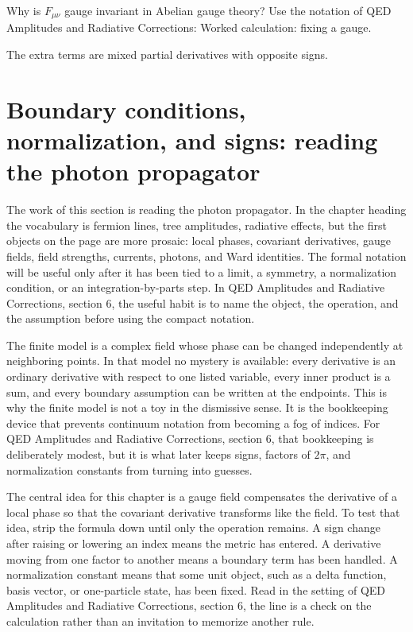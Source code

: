 \begin{exercise}
Why is \(F_{\mu\nu}\) gauge invariant in Abelian gauge theory?  Use the notation of QED Amplitudes and Radiative Corrections: Worked calculation: fixing a gauge.
\begin{answer}
The extra terms are mixed partial derivatives with opposite signs.
\end{answer}
\end{exercise}



\section{Boundary conditions, normalization, and signs: reading the photon propagator}

The work of this section is reading the photon propagator.  In the chapter heading the vocabulary is fermion lines, tree amplitudes, radiative effects, but the first objects on the page are more prosaic: local phases, covariant derivatives, gauge fields, field strengths, currents, photons, and Ward identities.  The formal notation will be useful only after it has been tied to a limit, a symmetry, a normalization condition, or an integration-by-parts step.  In QED Amplitudes and Radiative Corrections, section 6, the useful habit is to name the object, the operation, and the assumption before using the compact notation.

The finite model is a complex field whose phase can be changed independently at neighboring points.  In that model no mystery is available: every derivative is an ordinary derivative with respect to one listed variable, every inner product is a sum, and every boundary assumption can be written at the endpoints.  This is why the finite model is not a toy in the dismissive sense.  It is the bookkeeping device that prevents continuum notation from becoming a fog of indices.  For QED Amplitudes and Radiative Corrections, section 6, that bookkeeping is deliberately modest, but it is what later keeps signs, factors of \(2\pi\), and normalization constants from turning into guesses.

The central idea for this chapter is a gauge field compensates the derivative of a local phase so that the covariant derivative transforms like the field.  To test that idea, strip the formula down until only the operation remains.  A sign change after raising or lowering an index means the metric has entered.  A derivative moving from one factor to another means a boundary term has been handled.  A normalization constant means that some unit object, such as a delta function, basis vector, or one-particle state, has been fixed.  Read in the setting of QED Amplitudes and Radiative Corrections, section 6, the line is a check on the calculation rather than an invitation to memorize another rule.

